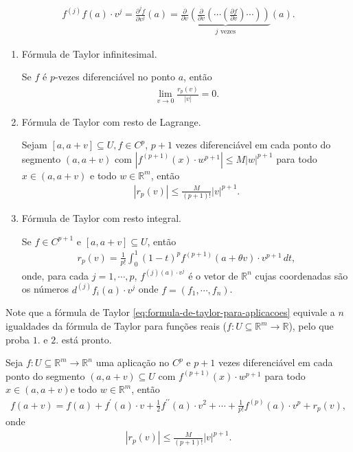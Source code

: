 \begin{align*}
  f^{(j)}f(a)\cdot v^{j}=\frac{\partial ^{j}f}{\partial v^{j}}(a)=\underbrace{\frac{\partial }{\partial v}\left(\frac{\partial }{\partial v}\left(\cdots\left(\frac{\partial f}{\partial v}\right)\cdots\right)\right)}_{j\text{ vezes}}(a).
\end{align*}
\begin{note}[Resto]
  \phantom{x}
  \begin{enumerate}
    \item Fórmula de Taylor infinitesimal.

      Se $f$ é $p$-vezes diferenciável no ponto $a$, então
      \begin{align*}
        \lim_{v\to 0}\frac{r_p(v)}{|v|}=0.
      \end{align*}
    \item Fórmula de Taylor com resto de Lagrange.

      Sejam $[a,a+v]\subseteq U,f\in C^{p}$, $p+1$ vezes diferenciável em cada ponto do segmento $(a,a+v)$ com $|f^{(p+1)}(x)\cdot w^{p+1}|\leq M|w|^{p+1}$ para todo $x\in (a,a+v)$ e todo $w\in\mathbb{R}^{m}$, então 
      \begin{align*}
        |r_p(v)|\leq \frac{M}{(p+1)!}|v|^{p+1}.
      \end{align*}
    \item Fórmula de Taylor com resto integral.

      Se $f\in C^{p+1}$ e $[a,a+v]\subseteq U$, então
      \begin{align*}
        r_p(v)=\frac{1}{p!}\int_{0}^{1}(1-t)^{p}f^{(p+1)}(a+\theta v)\cdot v^{p+1}\,dt,
      \end{align*}
      onde, para cada $j=1,\cdots,p$, $f^{(j)(a)\cdot v^{j}}$ é o vetor de $\mathbb{R}^{n}$ cujas coordenadas são os números $d^{(j)}f_i(a)\cdot v^{j}$ onde $f=(f_1,\cdots,f_n)$. 
  \end{enumerate}
\end{note}
Note que a fórmula de Taylor \eqref{eq:formula-de-taylor-para-aplicacoes} equivale a $n$ igualdades da fórmula de Taylor para funções reais ($f:U\subseteq \mathbb{R}^{m}\to\mathbb{R}$), pelo que proba $1.$ e $2.$ está pronto.
\begin{theorem}
  Seja $f:U\subseteq \mathbb{R}^{m}\to\mathbb{R}^{n}$ uma aplicação no $C^{p}$ e $p+1$ vezes diferenciável em cada ponto do segmento $(a,a+v)\subseteq U$ com $f^{(p+1)}(x)\cdot w^{p+1}$ para todo $x\in (a,a+v)$e todo $w\in\mathbb{R}^{m}$, então 
  \begin{align*}
    f(a+v)=f(a)+f^{\prime}(a)\cdot v+\frac{1}{2}f^{\prime\prime}(a)\cdot v^{2}+\cdots+\frac{1}{p!}f^{(p)}(a)\cdot v^{p}+r_p(v),
  \end{align*}
  onde
  \begin{align*}
    |r_p(v)|\leq \frac{M}{(p+1)!}|v|^{p+1}. 
  \end{align*}
\end{theorem}
